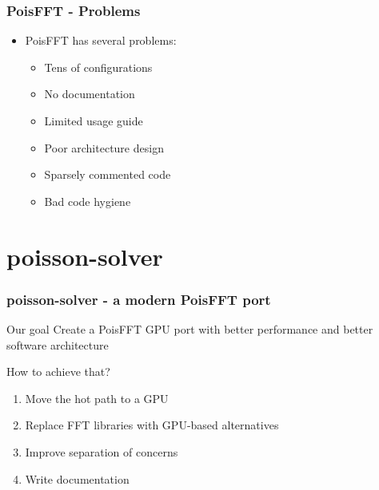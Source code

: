 \documentclass{beamer}
\begin{document}
\begin{frame}
    \frametitle{PoisFFT - Problems}
    \begin{itemize}
        \item PoisFFT has several problems:\pause
            \begin{itemize}
                \item Tens of configurations\pause
                \item No documentation\pause
                \item Limited usage guide\pause
                \item Poor architecture design\pause
                \item Sparsely commented code\pause
                \item Bad code hygiene
            \end{itemize}
    \end{itemize}
\end{frame}

\section{poisson-solver}
\begin{frame}
    \frametitle{poisson-solver - a modern PoisFFT port}
    \begin{alertblock}{Our goal}
        Create a PoisFFT GPU port with better performance and better software architecture\pause
    \end{alertblock}
    How to achieve that?\pause
    \begin{enumerate}
        \item Move the hot path to a GPU\pause
        \item Replace FFT libraries with GPU-based alternatives\pause
        \item Improve separation of concerns\pause
        \item Write documentation
    \end{enumerate}
\end{frame}
\end{document}
